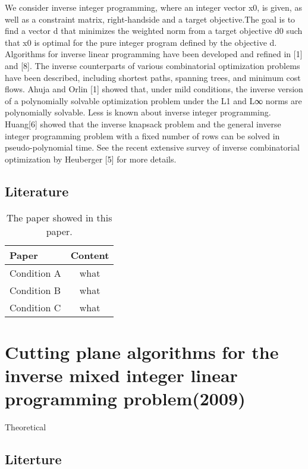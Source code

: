 \documentclass[UTF8]{article}
\begin{document}
We consider inverse integer programming, where an integer vector x0, is given, as well as a constraint matrix, right-handside and a target objective.The goal is to ﬁnd a vector d that minimizes the weighted norm from a target objective d0 such that x0 is optimal for the pure integer program deﬁned by the objective d. Algorithms for inverse linear programming have been developed and reﬁned in [1] and [8]. The inverse counterparts of various combinatorial optimization problems have been described, including shortest paths, spanning trees, and minimum cost flows. Ahuja and Orlin [1] showed that, under mild conditions, the inverse version of a polynomially solvable optimization problem under the L1 and L∞ norms are polynomially solvable. Less is known about inverse integer programming. Huang[6] showed that the inverse knapsack problem and the general inverse integer programming problem with a  ﬁxed number of rows can be solved in pseudo-polynomial time. See the recent extensive survey of inverse combinatorial optimization by Heuberger [5] for more details.


\subsection{Literature}


\begin{table}[ht]

\tabcolsep=70pt

\small\renewcommand{}

\caption{The paper showed in this paper.\label{tab:1}}

{\begin{tabular}{lc}
\hline
Paper & Content \\
\hline
Condition A & what \\
\hline
Condition B & what \\
\hline
Condition C & what \\
\hline
\end{tabular}}
{}
\end{table}




\section{Cutting plane algorithms for the inverse mixed integer linear programming problem(2009)}

Theoretical


\subsection{Literture}
\end{document}
